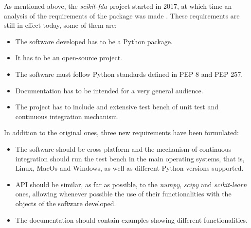 
As mentioned above, the \textit{scikit-fda} project started in 2017, at which time an
analysis of the requirements of the package was made \cite{FDA2018}. These
requirements are still in effect today, some of them are:

\begin{itemize}
\item The software developed has to be a Python package.
\item It has to be an open-source project.
\item The software must follow Python standards defined in PEP 8 and PEP 257.
\item Documentation has to be intended for a very general audience.
\item The project has to include and extensive test bench of unit test and continuous integration mechanism.
\end{itemize}
In addition to the original ones, three new requirements have been formulated:

\begin{itemize}
\item The software should be cross-platform and the mechanism of
 continuous integration should run the test bench in the main operating systems, that is, 
 Linux, MacOs and Windows, as well as different Python versions supported.
 
\item  API should be similar, as far as possible, to the \textit{numpy}, \textit{scipy} and
 \textit{scikit-learn} ones, allowing whenever possible the use of their functionalities with the
  objects of the software developed.
\item The documentation should contain examples showing different functionalities.
\end{itemize}
